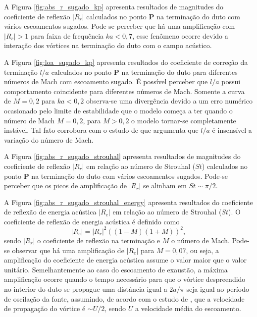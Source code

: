 \begin{figure}[ht!]
  \centering
  
\end{figure}

A Figura \ref{fig:abs_r_sugado_kp} apresenta resultados de magnitudes do coeficiente de reflexão $|R_{r}|$ calculados no ponto $\textbf{P}$ na terminação do duto com vários escoamentos sugados. Pode-se perceber que há uma amplificação com $|R_{r}| > 1$ para faixa de frequência $ka < 0,7$, esse fenômeno ocorre devido a interação dos vórtices na terminação do duto com o campo acústico.

A Figura \ref{fig:loa_sugado_kp} apresenta resultados do coeficiente de correção da terminação $l/a$ calculados no ponto $\textbf{P}$ na terminação do duto para diferentes números de Mach com escoamento sugado. É possível perceber que $l/a$ possui comportamento coincidente para diferentes números de Mach. Somente a curva de $M = 0,2$ para $ka < 0,2$ observa-se uma divergência devido a um erro numérico ocasionado pelo limite de estabilidade que o modelo começa a ter quando o número de Mach $M = 0,2$, para $M > 0,2$ o modelo tornar-se completamente instável. Tal fato corrobora com o estudo de  que argumenta que $l/a$ é insensível a variação do número de Mach.  

\begin{figure}[ht!]
  \centering
  
\end{figure}

\begin{figure}[ht!]
\centering
  
\end{figure}

 A Figura \ref{fig:abs_r_sugado_strouhal} apresenta resultados de magnitudes do coeficiente de reflexão $|R_{r}|$ em relação ao número de Strouhal ($St$) calculados no ponto $\textbf{P}$ na terminação do duto com vários escoamentos sugados. Pode-se perceber que os picos de amplificação de $|R_{r}|$ se alinham em $St \sim \pi/2$.

A Figura \ref{fig:abs_r_sugado_strouhal_energy} apresenta resultados do coeficiente de reflexão de energia acústica $|R_{e}|$ em relação ao número de Strouhal ($St$). O coeficiente de reflexão de energia acústica é definido como 
\begin{equation}
 |R_{e}| = |R_{r}|^{2}((1 - M)(1 + M))^{2}, 
\end{equation}
sendo $|R_{r}|$ o coeficiente de reflexão na terminação e $M$ o número de Mach. Pode-se observar que há uma amplificação de $|R_{e}|$ para $M = 0,07$, ou seja, a amplificação do coeficiente de energia acústica assume o valor maior que o valor unitário. Semelhantemente ao caso do escoamento de exaustão, a máxima amplificação ocorre quando o tempo necessário para que o vórtice despreendido no interior do duto se propague uma distância igual a $2a/\pi$ seja igual ao período de oscilação da fonte, assumindo, de acordo com o estudo de , que a velocidade de propagação do vórtice é $\sim U/2$, sendo $U$ a velocidade média do escoamento. 

